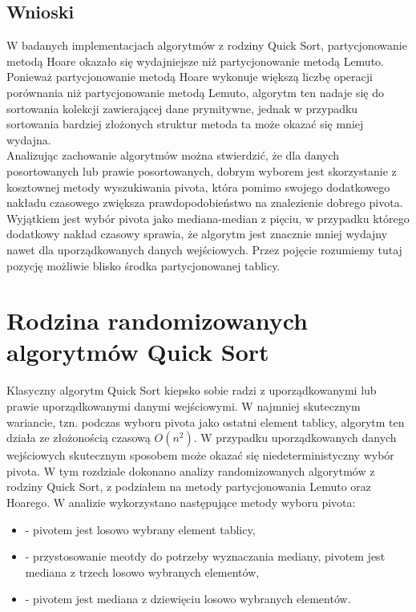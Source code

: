 \subsection{Wnioski}
W badanych implementacjach algorytmów z rodziny Quick Sort, partycjonowanie metodą Hoare okazało się wydajniejsze niż partycjonowanie metodą Lemuto. Ponieważ partycjonowanie metodą Hoare wykonuje większą liczbę operacji porównania niż partycjonowanie metodą Lemuto, algorytm ten nadaje się do sortowania kolekcji zawierającej dane prymitywne, jednak w przypadku sortowania bardziej złożonych struktur metoda ta może okazać się mniej wydajna.\\

Analizując zachowanie algorytmów można stwierdzić, że dla danych posortowanych lub prawie posortowanych, dobrym wyborem jest skorzystanie z kosztownej metody wyszukiwania pivota, która pomimo swojego dodatkowego nakładu czasowego zwiększa prawdopodobieństwo na znalezienie dobrego pivota. Wyjątkiem jest wybór pivota jako mediana-median z pięciu, w przypadku którego dodatkowy nakład czasowy sprawia, że algorytm jest znacznie mniej wydajny nawet dla uporządkowanych danych wejściowych. Przez pojęcie  rozumiemy tutaj pozycję możliwie blisko środka partycjonowanej tablicy.\\

\section{Rodzina randomizowanych algorytmów Quick Sort}
Klasyczny algorytm Quick Sort kiepsko sobie radzi z uporządkowanymi lub prawie uporządkowanymi danymi wejściowymi. W najmniej skutecznym wariancie, tzn. podczas wyboru pivota jako ostatni element tablicy, algorytm ten działa ze złożonością czasową $O(n^2)$. W przypadku uporządkowanych danych wejściowych skutecznym sposobem może okazać się niedeterministyczny wybór pivota. W tym rozdziale dokonano analizy randomizowanych algorytmów z rodziny Quick Sort, z podziałem na metody partycjonowania Lemuto oraz Hoarego. W analizie wykorzystano następujące metody wyboru pivota:

\begin{itemize}
	\setlength\itemsep{0em}
	\item {} - pivotem jest losowo wybrany element tablicy,
	\item {} - przystosowanie meotdy  do potrzeby wyznaczania mediany, pivotem jest mediana z trzech losowo wybranych elementów,
	\item {} - pivotem jest mediana z dziewięciu losowo wybranych elementów.\\
\end{itemize}

